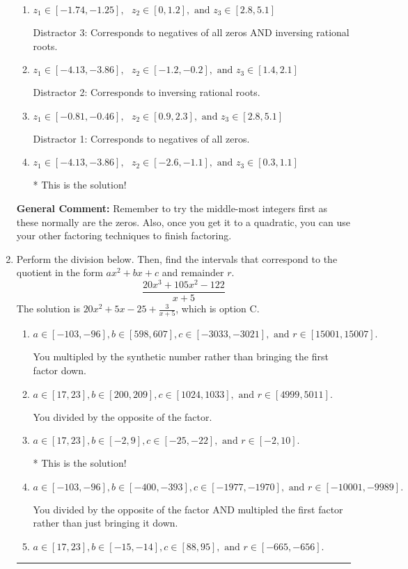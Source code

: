 \documentclass{extbook}[14pt]
\newcommand{\litem}[1]{\item #1

\rule{\textwidth}{0.4pt}}
\begin{document}
\begin{enumerate}
{\begin{enumerate}[label=\Alph*.]
 Distractor 4: Corresponds to moving factors from one rational to another.
\item \( z_1 \in [-1.74, -1.25], \text{   }  z_2 \in [0, 1.2], \text{   and   } z_3 \in [2.8, 5.1] \)

 Distractor 3: Corresponds to negatives of all zeros AND inversing rational roots.
\item \( z_1 \in [-4.13, -3.86], \text{   }  z_2 \in [-1.2, -0.2], \text{   and   } z_3 \in [1.4, 2.1] \)

 Distractor 2: Corresponds to inversing rational roots.
\item \( z_1 \in [-0.81, -0.46], \text{   }  z_2 \in [0.9, 2.3], \text{   and   } z_3 \in [2.8, 5.1] \)

 Distractor 1: Corresponds to negatives of all zeros.
\item \( z_1 \in [-4.13, -3.86], \text{   }  z_2 \in [-2.6, -1.1], \text{   and   } z_3 \in [0.3, 1.1] \)

* This is the solution!
\end{enumerate}

\textbf{General Comment:} Remember to try the middle-most integers first as these normally are the zeros. Also, once you get it to a quadratic, you can use your other factoring techniques to finish factoring.
}
\litem{
Perform the division below. Then, find the intervals that correspond to the quotient in the form $ax^2+bx+c$ and remainder $r$.
\[ \frac{20x^{3} +105 x^{2} -122}{x + 5} \]The solution is \( 20x^{2} +5 x -25 + \frac{3}{x + 5} \), which is option C.\begin{enumerate}[label=\Alph*.]
\item \( a \in [-103, -96], b \in [598, 607], c \in [-3033, -3021], \text{ and } r \in [15001, 15007]. \)

 You multipled by the synthetic number rather than bringing the first factor down.
\item \( a \in [17, 23], b \in [200, 209], c \in [1024, 1033], \text{ and } r \in [4999, 5011]. \)

 You divided by the opposite of the factor.
\item \( a \in [17, 23], b \in [-2, 9], c \in [-25, -22], \text{ and } r \in [-2, 10]. \)

* This is the solution!
\item \( a \in [-103, -96], b \in [-400, -393], c \in [-1977, -1970], \text{ and } r \in [-10001, -9989]. \)

 You divided by the opposite of the factor AND multipled the first factor rather than just bringing it down.
\item \( a \in [17, 23], b \in [-15, -14], c \in [88, 95], \text{ and } r \in [-665, -656]. \)


\end{enumerate}}
\end{enumerate}
\end{document}
